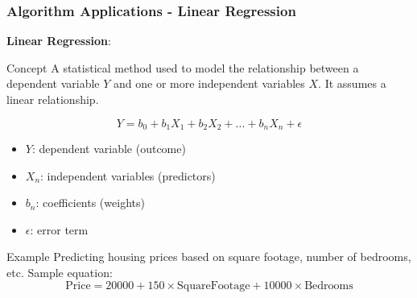 \documentclass[aspectratio=169]{beamer}
\begin{document}
\begin{frame}[fragile]
    \frametitle{Algorithm Applications - Linear Regression}
    \textbf{Linear Regression}:
    \begin{block}{Concept}
        A statistical method used to model the relationship between a dependent variable \( Y \) and one or more independent variables \( X \). It assumes a linear relationship.
    \end{block}
    \begin{equation}
        Y = b_0 + b_1X_1 + b_2X_2 + ... + b_nX_n + \epsilon
    \end{equation}
    \begin{itemize}
        \item \( Y \): dependent variable (outcome)
        \item \( X_n \): independent variables (predictors)
        \item \( b_n \): coefficients (weights)
        \item \( \epsilon \): error term
    \end{itemize}
    \begin{block}{Example}
        Predicting housing prices based on square footage, number of bedrooms, etc. Sample equation:
        \[
        \text{Price} = 20000 + 150 \times \text{SquareFootage} + 10000 \times \text{Bedrooms}
        \]
    \end{block}
\end{frame}
\end{document}
